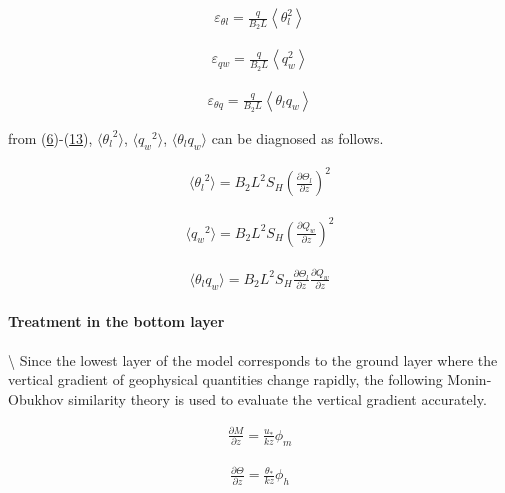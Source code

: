 \begin{eqnarray}
\varepsilon_{\theta l}=\frac{q}{B_{2} L}\left\langle\theta_{l}^{2}\right\rangle \tag{p-dif.11}
\end{eqnarray}

\begin{eqnarray}
\varepsilon_{q w}=\frac{q}{B_{2} L}\left\langle q_{w}^{2}\right\rangle \tag{p-dif.12}
\end{eqnarray}

\begin{eqnarray}
\varepsilon_{\theta q}=\frac{q}{B_{2} L}\left\langle\theta_{l} q_{w}\right\rangle \tag{p-dif.13}
\end{eqnarray}

from (\href{p-dif.6}{6})-(\href{p-dif.13}{13}),
\(\langle {\theta_l}^2 \rangle\), \(\langle {q_w}^2 \rangle\),
\(\langle \theta_l q_w \rangle\) can be diagnosed as follows.

\begin{eqnarray}\langle {\theta_l}^2 \rangle =B_2L^2S_H\left(\frac{\partial \Theta_l}{\partial z}\right)^2\end{eqnarray}

\begin{eqnarray}\langle {q_w}^2 \rangle =B_2L^2S_H\left(\frac{\partial Q_w}{\partial z}\right)^2\end{eqnarray}

\begin{eqnarray}\langle \theta_l q_w \rangle =B_2L^2S_H\frac{\partial \Theta_l}{\partial z}\frac{\partial Q_w}{\partial z}\end{eqnarray}

\hypertarget{treatment-in-the-bottom-layer}{%
\paragraph{Treatment in the bottom
layer}\label{treatment-in-the-bottom-layer}}

\textbackslash{} Since the lowest layer of the model corresponds to the
ground layer where the vertical gradient of geophysical quantities
change rapidly, the following Monin-Obukhov similarity theory is used to
evaluate the vertical gradient accurately.

\begin{eqnarray} \frac{\partial M}{\partial z} = \frac{u_*}{kz}\phi_m \tag{p-dif.14}\end{eqnarray}

\begin{eqnarray} \frac{\partial \Theta}{\partial z} = \frac{\theta_*}{kz}\phi_h \tag{p-dif.15}\end{eqnarray}

